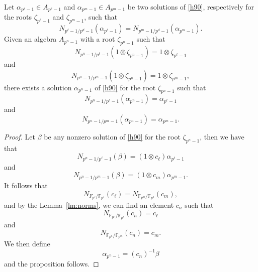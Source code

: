 \documentclass[a4paper,11pt]{article}
\begin{document}
\begin{prop}
  Let $\alpha_{p^\ell-1}\in A_{p^\ell-1}$ and $\alpha_{p^m-1}\in A_{p^m-1}$ be
  two solutions of \eqref{h90}, respectively for the roots $\zeta_{p^\ell-1}$ and
  $\zeta_{p^m-1}$, such that
  \[
    N_{p^\ell-1/p^d-1}(\alpha_{p^\ell-1})=N_{p^m-1/p^d-1}(\alpha_{p^m-1}).
  \]
  Given an algebra $A_{p^n-1}$ with a root $\zeta_{p^n-1}$ such that 
  \[
    N_{p^n-1/p^\ell-1}(1\otimes\zeta_{p^n-1})=1\otimes\zeta_{p^\ell-1}
  \]
  and
  \[
    N_{p^n-1/p^m-1}(1\otimes\zeta_{p^n-1})=1\otimes\zeta_{p^m-1},
  \]
  there exists a solution $\alpha_{p^n-1}$ of \eqref{h90} for the root $\zeta_{p^n-1}$ such that
  \[
    N_{p^n-1/p^\ell-1}(\alpha_{p^n-1})=\alpha_{p^\ell-1}
  \]
  and
  \[
    N_{p^n-1/p^m-1}(\alpha_{p^n-1})=\alpha_{p^m-1}.
  \]
\end{prop}
\begin{proof}
  Let $\beta$ be any nonzero solution of \eqref{h90} for the root
  $\zeta_{p^n-1}$, then we have that
  \[
    N_{p^n-1/p^\ell-1}(\beta)=(1\otimes c_\ell)\alpha_{p^\ell-1}
  \]
  and
  \[
    N_{p^n-1/p^m-1}(\beta)=(1\otimes c_m)\alpha_{p^m-1}.
  \]
  It follows that 
  \[
    N_{F_{p^\ell}/\mathbb{F}_{p^d}}(c_\ell)=N_{\mathbb{F}_{p^m}/\mathbb{F}_{p^d}}(c_m),
  \]
  and by the Lemma~\ref{lm:norms}, we can find an element $c_n$ such that
  \[
    N_{\mathbb{F}_{p^n}/\mathbb{F}_{p^\ell}}(c_n) = c_\ell
  \]
  and
  \[
    N_{\mathbb{F}_{p^n}/\mathbb{F}_{p^m}}(c_n)=c_m.
  \]
 We then define 
 \[
   \alpha_{p^n-1}=(c_n)^{-1}\beta
 \]
 and the proposition follows.

\end{proof}
\end{document}
